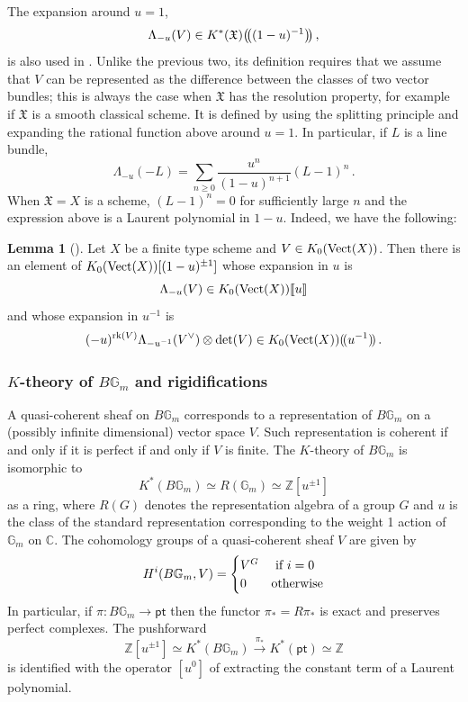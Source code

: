 \documentclass[12pt]{amsart}
\theoremstyle{definition}
\newtheorem{lemma}[definition]{Lemma}
\newcommand{\BC}{{\mathbb{C}}}
\newcommand{\BG}{{\mathbb{G}}}
\newcommand{\BZ}{{\mathbb{Z}}}
\newcommand{\1}{\mathbf 1}
\newcommand{\FX}{{\mathfrak{X}}}
\newcommand{\lppbig}{\big(\hspace{-0.2em}\big(}
\newcommand{\rppbig}{\big)\hspace{-0.2em}\big)}
\newcommand{\lpp}{(\hspace{-0.15em}(}
\newcommand{\rpp}{)\hspace{-0.15em})}
\newcommand{\pt}{{\mathsf{pt}}}
\newcommand{\rk}{\mathrm{rk}}
\begin{document}
The expansion around $u=1$,
\[\Lambda_{-u}(V)\in K^\ast(\FX)\lppbig(1-u)^{-1}\rppbig\,,\]
is also used in \cite[Definition 2.1.8]{Liu}. Unlike the previous two, its definition requires that we assume that $V$ can be represented as the difference between the classes of two vector bundles; this is always the case when $\FX$ has the resolution property, for example if $\FX$ is a smooth classical scheme. It is defined by using the splitting principle and expanding the rational function above around $u=1$. In particular, if $L$ is a line bundle,
\[\Lambda_{-u}(-L)=\sum_{n\geq 0}\frac{u^n}{(1-u)^{n+1}}(L-1)^n\,.\]
When $\FX=X$ is a scheme, $(L-1)^n=0$ for sufficiently large $n$ and the expression above is a Laurent polynomial in $1-u$. Indeed, we have the following:

\begin{lemma}[{\cite[2.1.8, 2.1.11]{Liu}}]\label{lem: symmetryexpansion}
    Let $X$ be a finite type scheme and $V\in K_0(\textup{Vect}(X))$. Then there is an element of $K_0(\textup{Vect}(X))[(1-u)^{\pm 1}]$ whose expansion in $u$ is 
    \[\Lambda_{-u}(V)\in K_0(\textup{Vect}(X))\llbracket u\rrbracket \]
    and whose expansion in $u^{-1}$ is 
    \[(-u)^{\rk(V)}\Lambda_{-u^{-1}}(V^\vee)\otimes \det(V)\in K_0(\textup{Vect}(X))\lpp u^{-1}\rpp\,.\]
\end{lemma}




\subsubsection{$K$-theory of $B\BG_m$ and rigidifications}\label{sec: Kthrig}

A quasi-coherent sheaf on $B\BG_m$ corresponds to a representation of $B\BG_m$ on a (possibly infinite dimensional) vector space $V$. Such representation is coherent if and only if it is perfect if and only if $V$ is finite. The $K$-theory of $B\BG_m$ is isomorphic to
\[K^\ast(B\BG_m)\simeq R(\BG_m)\simeq \BZ[u^{\pm 1}]\]
as a ring, where $R(G)$ denotes the representation algebra of a group $G$ and $u$ is the class of the standard representation corresponding to the weight 1 action of $\BG_m$ on $\BC$. The cohomology groups of a quasi-coherent sheaf $V$ are given by
\[H^i(B\BG_m, V)=\begin{cases}V^G&\textup{ if }i=0\\
0&\textup{otherwise}
\end{cases}\]
In particular, if $\pi\colon B\BG_m\to \pt$ then the functor $\pi_\ast=R\pi_\ast$ is exact and preserves perfect complexes. The pushforward
\[\BZ[u^{\pm 1}]\simeq K^\ast(B\BG_m)\xrightarrow{\pi_\ast} K^\ast(\pt)\simeq \BZ\]
is identified with the operator $[u^0]$ of extracting the constant term of a Laurent polynomial.
\end{document}
